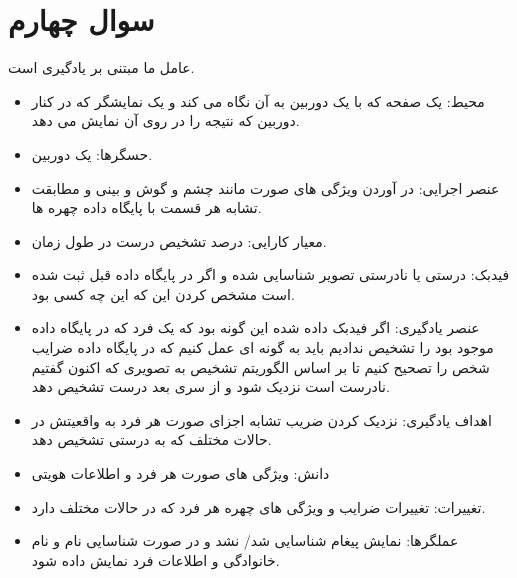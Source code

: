 \documentclass[paper=a4, fontsize=11pt]{article}
\begin{document}
\section{سوال چهارم}
عامل ما مبتنی بر یادگیری است.

\begin{itemize}
	\item
محیط: یک صفحه که با یک دوربین به آن نگاه می کند و یک نمایشگر که در کنار دوربین که نتیجه را در روی آن نمایش می دهد.
	\item
حسگرها: یک دوربین.
	\item
عنصر اجرایی: در آوردن ویژگی های صورت مانند چشم و گوش و بینی و مطابقت تشابه هر قسمت با پایگاه داده چهره ها.
	\item
معیار کارایی: درصد تشخیص درست در طول زمان.
	\item
فیدبک: درستی یا نادرستی تصویر شناسایی شده و اگر در پایگاه داده قبل ثبت شده است مشخص کردن این که این چه کسی بود.
	\item
عنصر یادگیری: اگر فیدبک داده شده این گونه بود که یک فرد که در پایگاه داده موجود بود را تشخیص ندادیم باید به گونه ای عمل کنیم که در پایگاه داده ضرایب شخص را تصحیح کنیم تا بر اساس الگوریتم تشخیص به تصویری که اکنون گفتیم نادرست است نزدیک شود و از سری بعد درست تشخیص دهد.
	\item
اهداف یادگیری: نزدیک کردن ضریب تشابه اجزای صورت هر فرد به واقعیتش در حالات مختلف که به درستی تشخیص دهد.
	\item
دانش: ویژگی های صورت هر فرد و اطلاعات هویتی
	\item
تغییرات: تغییرات ضرایب  و ویژگی های چهره هر فرد که در حالات مختلف دارد.
	\item
عملگرها: نمایش پیغام شناسایی شد/ نشد و در صورت شناسایی نام و نام خانوادگی و اطلاعات فرد نمایش داده شود.

\end{itemize}
\end{document}
